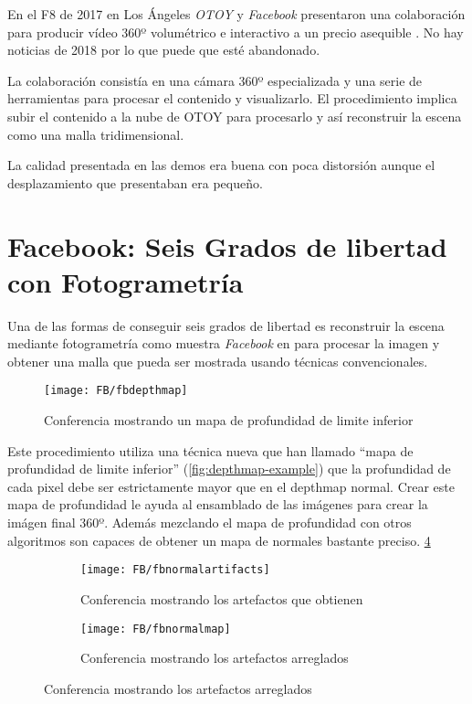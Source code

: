 En el F8 de 2017 en Los Ángeles \textit{OTOY} y \textit{Facebook} presentaron una colaboración para producir vídeo 360º volumétrico e interactivo a un precio asequible \cite{OtoyVR}. No hay noticias de 2018 por lo que puede que esté abandonado.

La colaboración consistía en una cámara 360º especializada y una serie de herramientas para procesar el contenido y visualizarlo. El procedimiento implica subir el contenido a la nube de OTOY para procesarlo y así reconstruir la escena como una malla tridimensional. 

La calidad presentada en las demos era buena con poca distorsión aunque el desplazamiento que presentaban era pequeño.

\section{Facebook: Seis Grados de libertad con Fotogrametría}
Una de las formas de conseguir seis grados de libertad es reconstruir la escena mediante fotogrametría como muestra \textit{Facebook} en \cite{FBCasual3DCapture} para procesar la imagen y obtener una malla que pueda ser mostrada usando técnicas convencionales.

\begin{figure}[h]
  \centering
	\texttt{[image: FB/fbdepthmap]}
  \caption{Conferencia mostrando un mapa de profundidad de limite inferior}
  \label{fig:fbLBdepthmap-example}
\end{figure}

Este procedimiento utiliza una técnica nueva que han llamado ``mapa de profundidad de limite inferior'' (\ref{fig:depthmap-example}) que la profundidad de cada pixel debe ser estrictamente mayor que en el depthmap normal. Crear este mapa de profundidad le ayuda al ensamblado de las imágenes para crear la imágen final 360º. Además mezclando el mapa de profundidad con otros algoritmos son capaces de obtener un mapa de normales bastante preciso. \ref{fig:fbnormalmapcorrected-example}

\begin{figure}[h]
\centering
\begin{subfigure}{.47\linewidth}
	\centering
	\texttt{[image: FB/fbnormalartifacts]}
  \caption{Conferencia mostrando los artefactos que obtienen}
  \label{fig:fbnormalmapartifacts-example}
\end{subfigure}%
\hspace{.05\linewidth}
\begin{subfigure}{.47\linewidth}
	\centering
	\texttt{[image: FB/fbnormalmap]}
  \caption{Conferencia mostrando los artefactos arreglados}
  \label{fig:fbnormalmapcorrected-example}
\end{subfigure}
\end{figure}


